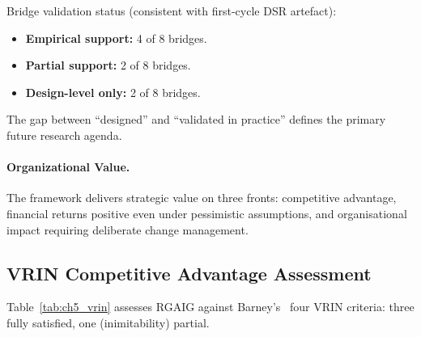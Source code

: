Bridge validation status (consistent with first-cycle DSR artefact):

\begin{itemize}
    \item \textbf{Empirical support:} 4 of 8 bridges.
    \item \textbf{Partial support:} 2 of 8 bridges.
    \item \textbf{Design-level only:} 2 of 8 bridges.
\end{itemize}

\noindent The gap between ``designed'' and ``validated in practice'' defines the primary future research agenda.
\fi

\paragraph{Organizational Value.}

The framework delivers strategic value on three fronts: competitive advantage, financial returns positive even under pessimistic assumptions, and organisational impact requiring deliberate change management.

\subsection{VRIN Competitive Advantage Assessment}

Table~\ref{tab:ch5_vrin} assesses RGAIG against Barney's~\cite{barney1991firm} four VRIN criteria: three fully satisfied, one (inimitability) partial.

